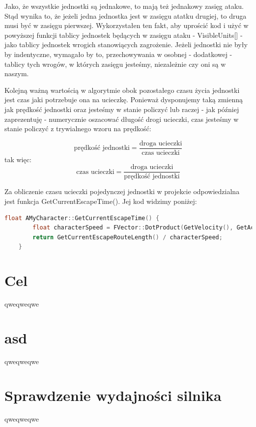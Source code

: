 \documentclass[12pt]{report}
\begin{document}
Jako, że wszystkie jednostki są jednakowe, to mają też jednakowy zasięg ataku. Stąd wynika to, że jeżeli jedna jednostka jest w zasięgu atatku drugiej, to druga musi być w zasięgu pierwszej. Wykorzystałen ten fakt, aby uprościć kod i użyć w powyższej funkcji tablicy jednostek będących w zasięgu ataku - VisibleUnits[] - jako tablicy jednostek wrogich stanowiących zagrożenie. Jeżeli jednostki nie były by indentyczne, wymagało by to, przechowywania w osobnej - dodatkowej - tablicy tych wrogów, w których zasięgu jesteśmy, niezależnie czy oni są w naszym.

Kolejną ważną wartością w algorytmie obok pozostałego czasu życia jednostki jest czas jaki potrzebuje ona na ucieczkę. Ponieważ dysponujemy taką zmienną jak prędkość jednostki oraz jesteśmy w stanie policzyć lub raczej - jak później zaprezentuję - numerycznie oszacować długość drogi ucieczki, czas jesteśmy w stanie policzyć z trywialnego wzoru na prędkość:

\[ \text{prędkość jednostki} =  \dfrac{\text{droga ucieczki}}{\text{czas ucieczki}}  \]
tak więc:
\[ {\text{czas ucieczki}} =  \dfrac{\text{droga ucieczki}}{\text{prędkość jednostki}}  \]


Za obliczenie czasu ucieczki pojedynczej jednostki w projekcie odpowiedzialna jest funkcja GetCurrentEscapeTime(). Jej kod widzimy poniżej: 

\begin{lstlisting}[language=C++, backgroundcolor=\color{black!5}, basicstyle=\footnotesize, caption=Funkcja GetCurrentEscapeTime w klasie AMyCharacter.cpp.]
	float AMyCharacter::GetCurrentEscapeTime() {
		float characterSpeed = FVector::DotProduct(GetVelocity(), GetActorRotation().Vector());
		return GetCurrentEscapeRouteLength() / characterSpeed;
	}
\end{lstlisting}
\section{Cel}
qweqweqwe
\section{asd}
qweqweqwe
\section{Sprawdzenie wydajności silnika}
qweqweqwe
\end{document}
